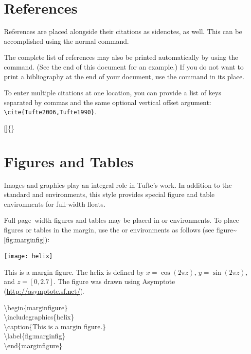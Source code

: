 \documentclass[
  letterpaper,
  DIV=11,
  numbers=noendperiod]{scrartcl}
\begin{document}
\section{References}

References are placed alongside their citations as sidenotes, as well.
This can be accomplished using the normal 
command.

The complete list of references may also be printed automatically by
using the  command. (See the end of this
document for an example.) If you do not want to print a bibliography at
the end of your document, use the  command in
its place.

To enter multiple citations at one
location,\cite[-3\baselineskip]{Tufte2006,Tufte1990} you can provide a
list of keys separated by commas and the same optional vertical offset
argument: \Verb|\cite{Tufte2006,Tufte1990}|.\\

\begin{docspec}
  []\{\}
\end{docspec}

\section{Figures and Tables}\label{sec:figures-and-tables}

Images and graphics play an integral role in Tufte's work. In addition
to the standard  and  environments,
this style provides special figure and table environments for full-width
floats.

Full page--width figures and tables may be placed in 
or  environments. To place figures or tables in the
margin, use the  or 
environments as follows (see
figure\textasciitilde{}\ref{fig:marginfig}):

\begin{marginfigure}%
  \texttt{[image: helix]}
  \caption{This is a margin figure.  The helix is defined by 
    $x = \cos(2\pi z)$, $y = \sin(2\pi z)$, and $z = [0, 2.7]$.  The figure was
    drawn using Asymptote (\url{http://asymptote.sf.net/}).}
  \label{fig:marginfig}
\end{marginfigure}

\begin{docspec}
\textbackslash begin\{marginfigure\}\\
  \qquad\textbackslash includegraphics\{helix\}\\
  \qquad\textbackslash caption\{This is a margin figure.\}\\
  \qquad\textbackslash label\{fig:marginfig\}\\
\textbackslash end\{marginfigure\}\\
\end{docspec}
\end{document}
